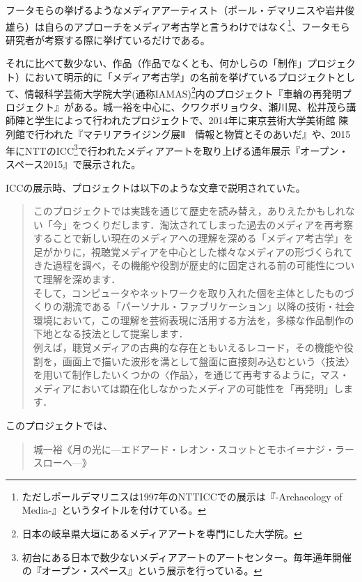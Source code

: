 \documentclass[a4paper,report]{jsbook}
\begin{document}
フータモらの挙げるようなメディアアーティスト（ポール・デマリニスや岩井俊雄ら）は自らのアプローチをメディア考古学と言うわけではなく\footnote{ただしポールデマリニスは1997年のNTTICCでの展示は『-Archaeology
  of Media-』というタイトルを付けている。}、フータモら研究者が考察する際に挙げているだけである。

それに比べて数少ない、作品（作品でなくとも、何かしらの「制作」プロジェクト）において明示的に「メディア考古学」の名前を挙げているプロジェクトとして、情報科学芸術大学院大学(通称IAMAS)\footnote{日本の岐阜県大垣にあるメディアアートを専門にした大学院。}内のプロジェクト『車輪の再発明プロジェクト』がある。城一裕を中心に、クワクボリョウタ、瀬川晃、松井茂ら講師陣と学生によって行われたプロジェクトで、2014年に東京芸術大学美術館
陳列館で行われた『マテリアライジング展Ⅱ　情報と物質とそのあいだ』や、2015年にNTTのICC\footnote{初台にある日本で数少ないメディアアートのアートセンター。毎年通年開催の『オープン・スペース』という展示を行っている。}で行われたメディアアートを取り上げる通年展示『オープン・スペース2015』で展示された。\autocites{iamas:RIWP}{mtrlzng:RIWP}

ICCの展示時、プロジェクトは以下のような文章で説明されていた。

\begin{quote}
このプロジェクトでは実践を通じて歴史を読み替え，ありえたかもしれない「今」をつくりだします．淘汰されてしまった過去のメディアを再考察することで新しい現在のメディアへの理解を深める「メディア考古学」を足がかりに，視聴覚メディアを中心とした様々なメディアの形づくられてきた過程を調べ，その機能や役割が歴史的に固定される前の可能性について理解を深めます．\\
そして，コンピュータやネットワークを取り入れた個を主体としたものづくりの潮流である「パーソナル・ファブリケーション」以降の技術・社会環境において，この理解を芸術表現に活用する方法を，多様な作品制作の下地となる技法として提案します．\\
例えば，聴覚メディアの古典的な存在ともいえるレコード，その機能や役割を，画面上で描いた波形を溝として盤面に直接刻み込むという〈技法〉を用いて制作したいくつかの〈作品〉，を通じて再考するように，マス・メディアにおいては顕在化しなかったメディアの可能性を「再発明」します．\\
\autocite{iamas:RIWP}
\end{quote}

このプロジェクトでは、

\begin{quote}
城一裕《月の光に---エドアード・レオン・スコットとモホイ＝ナジ・ラースローヘ---》
\end{quote}
\end{document}
